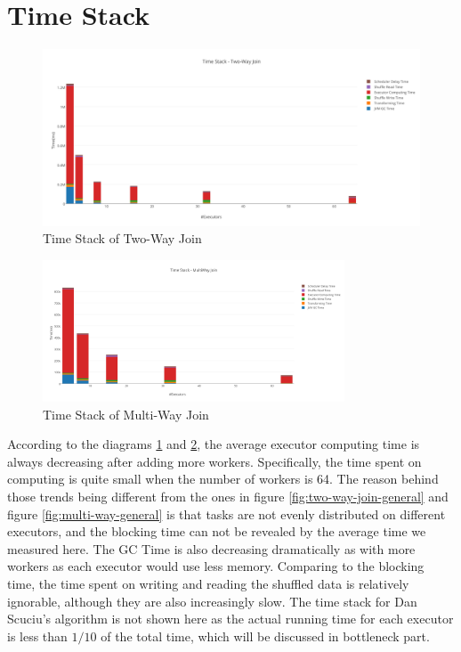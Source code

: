 \section{Time Stack}
\begin{figure}[h!]
  \caption{Time Stack of Two-Way Join}
  \label{fig:two-way-join-stack}
  \centering
    \includegraphics[width=1.0\textwidth]{img/Timestack-twoway}
\end{figure}
\begin{figure}[h!]
  \caption{Time Stack of Multi-Way Join}
  \label{fig:timestack-multiway}
  \centering
    \includegraphics[width=0.8\textwidth]{img/Timestack-multiway}
\end{figure}
According to the diagrams \ref{fig:two-way-join-stack} and \ref{fig:timestack-multiway}, the average executor computing time is always decreasing after adding more workers. Specifically, the time spent on computing is quite small when the number of workers is 64. The reason behind those trends being different from the ones in figure  \ref{fig:two-way-join-general} and figure \ref{fig:multi-way-general} is that tasks are not evenly distributed on different executors, and the blocking time can not be revealed by the average time we measured here. The GC Time is also decreasing dramatically as with more workers as each executor would use less memory. Comparing to the blocking time, the time spent on writing and reading the shuffled data is relatively ignorable, although they are also increasingly slow. The time stack for Dan Scuciu's algorithm is not shown here as the actual running time for each executor is less than $1/10$ of the total time, which will be discussed in bottleneck part.\\
